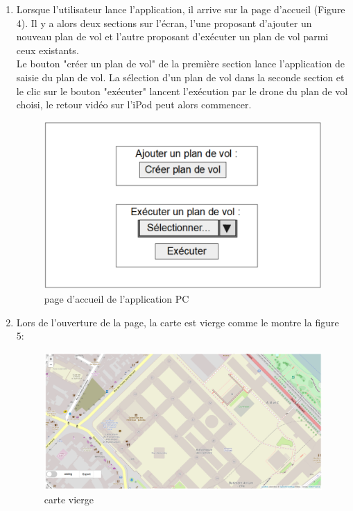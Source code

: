 \documentclass{article}
\begin{document}
 	\begin{enumerate}
 	\item Lorsque l'utilisateur lance l'application, il arrive sur la page d'accueil (Figure 4). Il y a alors deux sections sur l'écran, l'une proposant d'ajouter un nouveau plan de vol et l'autre proposant d'exécuter un plan de vol parmi ceux existants.\\
 	Le bouton "créer un plan de vol" de la première section lance l'application de saisie du plan de vol. La sélection d'un plan de vol dans la seconde section et le clic sur le bouton "exécuter" lancent l'exécution par le drone du plan de vol choisi, le retour vidéo sur l'iPod peut alors commencer.\\
 	
 	 \begin{figure}[!h]
 	\begin{center}
 	\includegraphics[scale=0.65]{maquette_appli_PC.PNG}
 	\caption{page d'accueil de l'application PC}
 	\end{center}
	\end{figure}
 	
 	\item Lors de l'ouverture de la page, la carte est vierge comme le montre la figure 5:\\
 	\begin{figure}[!h]
 	\begin{center}
 	\includegraphics[scale=0.42]{capt1.PNG}
 	\caption{carte vierge}
 	\end{center}
	\end{figure}
 	

\end{enumerate}
\end{document}
